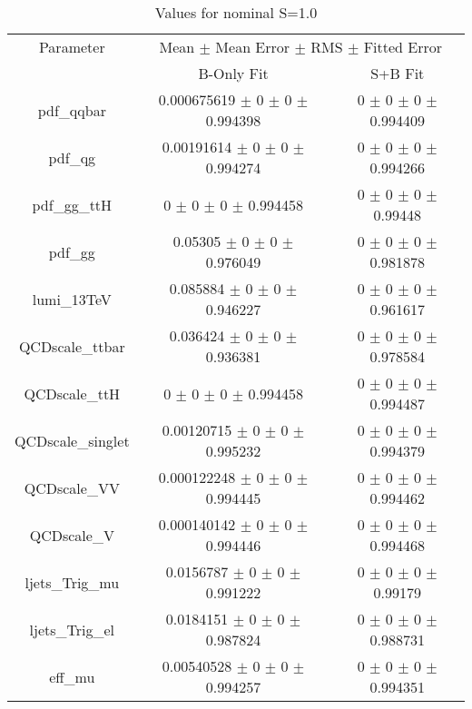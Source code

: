 \begin{table}
\centering
\caption{Values for nominal S=1.0}
\begin{tabular}{ccc}
\toprule
Parameter 	& \multicolumn{2}{c}{Mean $\pm$ Mean Error $\pm$ RMS $\pm$ Fitted Error}\\
 	& B-Only Fit & S+B Fit\\
\midrule
pdf\_qqbar 	& \num{0.000675619} $\pm$ \num{0} $\pm$ \num{0} $\pm$ \num{0.994398} 	& \num{0} $\pm$ \num{0} $\pm$ \num{0} $\pm$ \num{0.994409}\\
pdf\_qg 	& \num{0.00191614} $\pm$ \num{0} $\pm$ \num{0} $\pm$ \num{0.994274} 	& \num{0} $\pm$ \num{0} $\pm$ \num{0} $\pm$ \num{0.994266}\\
pdf\_gg\_ttH 	& \num{0} $\pm$ \num{0} $\pm$ \num{0} $\pm$ \num{0.994458} 	& \num{0} $\pm$ \num{0} $\pm$ \num{0} $\pm$ \num{0.99448}\\
pdf\_gg 	& \num{0.05305} $\pm$ \num{0} $\pm$ \num{0} $\pm$ \num{0.976049} 	& \num{0} $\pm$ \num{0} $\pm$ \num{0} $\pm$ \num{0.981878}\\
lumi\_13TeV 	& \num{0.085884} $\pm$ \num{0} $\pm$ \num{0} $\pm$ \num{0.946227} 	& \num{0} $\pm$ \num{0} $\pm$ \num{0} $\pm$ \num{0.961617}\\
QCDscale\_ttbar 	& \num{0.036424} $\pm$ \num{0} $\pm$ \num{0} $\pm$ \num{0.936381} 	& \num{0} $\pm$ \num{0} $\pm$ \num{0} $\pm$ \num{0.978584}\\
QCDscale\_ttH 	& \num{0} $\pm$ \num{0} $\pm$ \num{0} $\pm$ \num{0.994458} 	& \num{0} $\pm$ \num{0} $\pm$ \num{0} $\pm$ \num{0.994487}\\
QCDscale\_singlet 	& \num{0.00120715} $\pm$ \num{0} $\pm$ \num{0} $\pm$ \num{0.995232} 	& \num{0} $\pm$ \num{0} $\pm$ \num{0} $\pm$ \num{0.994379}\\
QCDscale\_VV 	& \num{0.000122248} $\pm$ \num{0} $\pm$ \num{0} $\pm$ \num{0.994445} 	& \num{0} $\pm$ \num{0} $\pm$ \num{0} $\pm$ \num{0.994462}\\
QCDscale\_V 	& \num{0.000140142} $\pm$ \num{0} $\pm$ \num{0} $\pm$ \num{0.994446} 	& \num{0} $\pm$ \num{0} $\pm$ \num{0} $\pm$ \num{0.994468}\\
ljets\_Trig\_mu 	& \num{0.0156787} $\pm$ \num{0} $\pm$ \num{0} $\pm$ \num{0.991222} 	& \num{0} $\pm$ \num{0} $\pm$ \num{0} $\pm$ \num{0.99179}\\
ljets\_Trig\_el 	& \num{0.0184151} $\pm$ \num{0} $\pm$ \num{0} $\pm$ \num{0.987824} 	& \num{0} $\pm$ \num{0} $\pm$ \num{0} $\pm$ \num{0.988731}\\
eff\_mu 	& \num{0.00540528} $\pm$ \num{0} $\pm$ \num{0} $\pm$ \num{0.994257} 	& \num{0} $\pm$ \num{0} $\pm$ \num{0} $\pm$ \num{0.994351}\\

\end{tabular}
\end{table}
